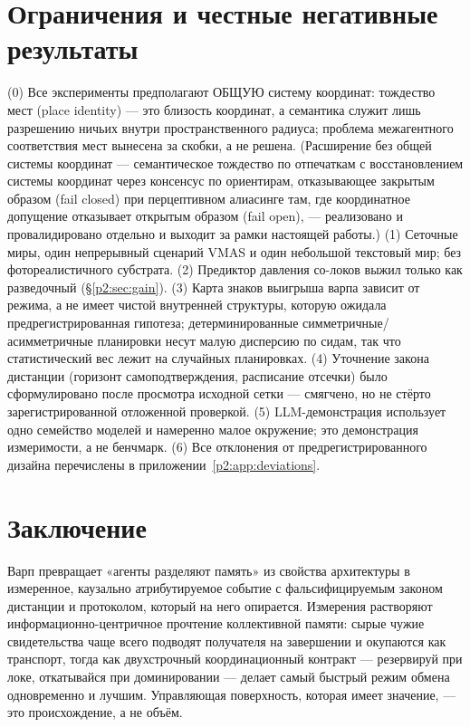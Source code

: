 \documentclass{article}
\begin{document}
\section{Ограничения и честные негативные результаты}
\label{p2:sec:limits}

(0) Все эксперименты предполагают ОБЩУЮ систему координат: тождество
мест (place identity) --- это близость координат, а семантика служит
лишь разрешению ничьих внутри пространственного радиуса; проблема
межагентного соответствия мест вынесена за скобки, а не решена.
(Расширение без общей системы координат --- семантическое тождество
по отпечаткам с восстановлением системы координат через консенсус по
ориентирам, отказывающее закрытым образом (fail closed) при
перцептивном алиасинге там, где координатное допущение отказывает
открытым образом (fail open), --- реализовано и провалидировано
отдельно и выходит за рамки настоящей работы.) (1) Сеточные миры,
один непрерывный сценарий VMAS и один небольшой текстовый мир; без
фотореалистичного субстрата. (2) Предиктор давления со-локов выжил
только как разведочный (\S\ref{p2:sec:gain}). (3) Карта знаков выигрыша
варпа зависит от режима, а не имеет чистой внутренней структуры,
которую ожидала предрегистрированная гипотеза; детерминированные
симметричные/асимметричные планировки несут малую дисперсию по сидам,
так что статистический вес лежит на случайных планировках. (4)
Уточнение закона дистанции (горизонт самоподтверждения, расписание
отсечки) было сформулировано после просмотра исходной сетки ---
смягчено, но не стёрто зарегистрированной отложенной проверкой. (5)
LLM-демонстрация использует одно семейство моделей и намеренно малое
окружение; это демонстрация измеримости, а не бенчмарк. (6) Все
отклонения от предрегистрированного дизайна перечислены в
приложении~\ref{p2:app:deviations}.

\section{Заключение}

Варп превращает «агенты разделяют память» из свойства архитектуры в
измеренное, каузально атрибутируемое событие с фальсифицируемым
законом дистанции и протоколом, который на него опирается. Измерения
растворяют информационно-центричное прочтение коллективной памяти:
сырые чужие свидетельства чаще всего подводят получателя на
завершении и окупаются как транспорт, тогда как двухстрочный
координационный контракт --- резервируй при локе, откатывайся при
доминировании --- делает самый быстрый режим обмена одновременно и
лучшим. Управляющая поверхность, которая имеет значение, --- это
происхождение, а не объём.
\end{document}
